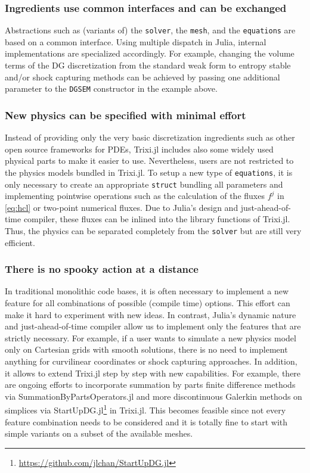 \documentclass{juliacon}
\newcommand{\trixi}{Trixi.jl\xspace}
\begin{document}
\subsubsection{Ingredients use common interfaces and can be exchanged}

Abstractions such as (variants of) the \lstinline{solver}, the \lstinline{mesh},
and the \lstinline{equations} are based on a common interface. Using multiple
dispatch in Julia, internal implementations are specialized accordingly. For
example, changing the volume terms of the DG discretization from the standard
weak form to entropy stable and/or shock capturing methods can be achieved by
passing one additional parameter to the \lstinline{DGSEM} constructor in the
example above.

\subsubsection{New physics can be specified with minimal effort}

Instead of providing only the very basic discretization ingredients such as
other open source frameworks for PDEs, \trixi includes also some widely used
physical parts to make it easier to use. Nevertheless, users are not restricted
to the physics models bundled in \trixi. To setup a new type of \lstinline{equations},
it is only necessary to create an appropriate \lstinline{struct} bundling all
parameters and implementing pointwise operations such as the calculation of
the fluxes $f^j$ in \eqref{eq:hcl} or two-point numerical fluxes. Due to Julia's
design and just-ahead-of-time compiler, these fluxes can be inlined into the
library functions of \trixi. Thus, the physics can be separated completely from
the \lstinline{solver} but are still very efficient.

\subsubsection{There is no spooky action at a distance}

In traditional monolithic code bases, it is often necessary to implement a new
feature for all combinations of possible (compile time) options. This effort
can make it hard to experiment with new ideas. In contrast, Julia's dynamic
nature and just-ahead-of-time compiler allow us to implement only the features
that are strictly necessary. For example, if a user wants to simulate a new
physics model only on Cartesian grids with smooth solutions, there is no need
to implement anything for curvilinear coordinates or shock capturing approaches.
In addition, it allows to extend \trixi step by step with new capabilities.
For example, there are ongoing efforts to incorporate summation by parts finite
difference methods via SummationByPartsOperators.jl \cite{ranocha2021sbp} and
more discontinuous Galerkin methods on simplices via StartUpDG.jl\footnote{\url{https://github.com/jlchan/StartUpDG.jl}} in \trixi. This becomes feasible since not every
feature combination needs to be considered and it is totally fine to start with
simple variants on a subset of the available meshes.
\end{document}
